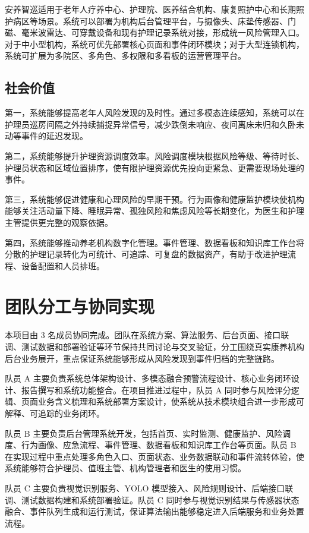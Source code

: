 \documentclass[UTF8,a4paper,zihao=-4,fontset=fandol]{ctexart}
\begin{document}
安养智巡适用于老年人疗养中心、护理院、医养结合机构、康复照护中心和长期照护病区等场景。系统可以部署为机构后台管理平台，与摄像头、床垫传感器、门磁、毫米波雷达、可穿戴设备和现有护理记录系统对接，形成统一风险管理入口。对于中小型机构，系统可优先部署核心页面和事件闭环模块；对于大型连锁机构，系统可扩展为多院区、多角色、多权限和多看板的运营管理平台。

\subsection{社会价值}

第一，系统能够提高老年人风险发现的及时性。通过多模态连续感知，系统可以在护理员巡房间隔之外持续捕捉异常信号，减少跌倒未响应、夜间离床未归和久卧未动等事件的延迟发现。

第二，系统能够提升护理资源调度效率。风险调度模块根据风险等级、等待时长、护理员状态和区域位置排序，使有限护理资源优先投向更紧急、更需要现场处理的事件。

第三，系统能够促进健康和心理风险的早期干预。行为画像和健康监护模块使机构能够关注活动量下降、睡眠异常、孤独风险和焦虑风险等长期变化，为医生和护理主管提供更完整的观察依据。

第四，系统能够推动养老机构数字化管理。事件管理、数据看板和知识库工作台将分散的护理记录转化为可统计、可追踪、可复盘的数据资产，有助于改进护理流程、设备配置和人员排班。

\section{团队分工与协同实现}

本项目由 3 名成员协同完成。团队在系统方案、算法服务、后台页面、接口联调、测试数据和部署验证等环节保持共同讨论与交叉验证，分工围绕真实康养机构后台业务展开，重点保证系统能够形成从风险发现到事件归档的完整链路。

队员 A 主要负责系统总体架构设计、多模态融合预警流程设计、核心业务闭环设计、报告撰写和系统功能整合。在项目推进过程中，队员 A 同时参与风险评分逻辑、页面业务含义梳理和系统部署方案设计，使系统从技术模块组合进一步形成可解释、可追踪的业务闭环。

队员 B 主要负责后台管理系统开发，包括首页、实时监测、健康监护、风险调度、行为画像、应急流程、事件管理、数据看板和知识库工作台等页面。队员 B 在实现过程中重点处理多角色入口、页面状态、业务数据联动和事件流转体验，使系统能够符合护理员、值班主管、机构管理者和医生的使用习惯。

队员 C 主要负责视觉识别服务、YOLO 模型接入、风险规则设计、后端接口联调、测试数据构建和系统部署验证。队员 C 同时参与视觉识别结果与传感器状态融合、事件队列生成和运行测试，保证算法输出能够稳定进入后端服务和业务处置流程。
\end{document}
